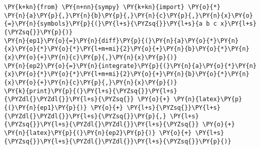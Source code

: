 \begin{Verbatim}[commandchars=\\\{\}]
\PY{k+kn}{from} \PY{n+nn}{sympy} \PY{k+kn}{import} \PY{o}{*}
\PY{n}{a}\PY{p}{,}\PY{n}{b}\PY{p}{,}\PY{n}{c}\PY{p}{,}\PY{n}{x}\PY{o}{=}\PY{n}{symbols}\PY{p}{(}\PY{l+s}{\PYZsq{}}\PY{l+s}{a b c x}\PY{l+s}{\PYZsq{}}\PY{p}{)}
\PY{n}{ep1}\PY{o}{=}\PY{n}{diff}\PY{p}{(}\PY{n}{a}\PY{o}{*}\PY{n}{x}\PY{o}{*}\PY{o}{*}\PY{l+m+mi}{2}\PY{o}{+}\PY{n}{b}\PY{o}{*}\PY{n}{x}\PY{o}{+}\PY{n}{c}\PY{p}{,}\PY{n}{x}\PY{p}{)}
\PY{n}{ep2}\PY{o}{=}\PY{n}{integrate}\PY{p}{(}\PY{n}{a}\PY{o}{*}\PY{n}{x}\PY{o}{*}\PY{o}{*}\PY{l+m+mi}{2}\PY{o}{+}\PY{n}{b}\PY{o}{*}\PY{n}{x}\PY{o}{+}\PY{n}{c}\PY{p}{,}\PY{n}{x}\PY{p}{)}
\PY{k}{print}\PY{p}{(}\PY{l+s}{\PYZsq{}}\PY{l+s}{\PYZdl{}\PYZdl{}}\PY{l+s}{\PYZsq{}} \PY{o}{+} \PY{n}{latex}\PY{p}{(}\PY{n}{ep1}\PY{p}{)} \PY{o}{+} \PY{l+s}{\PYZsq{}}\PY{l+s}{\PYZdl{}\PYZdl{}}\PY{l+s}{\PYZsq{}}\PY{p}{,} \PY{l+s}{\PYZsq{}}\PY{l+s}{\PYZdl{}\PYZdl{}}\PY{l+s}{\PYZsq{}} \PY{o}{+} \PY{n}{latex}\PY{p}{(}\PY{n}{ep2}\PY{p}{)} \PY{o}{+} \PY{l+s}{\PYZsq{}}\PY{l+s}{\PYZdl{}\PYZdl{}}\PY{l+s}{\PYZsq{}}\PY{p}{)}
\end{Verbatim}
